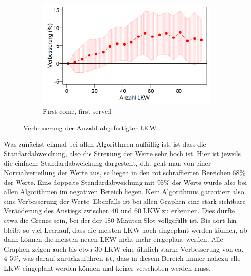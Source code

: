 \begin{figure}[H]
\begin{subfigure}{.5\textwidth}
  \centering
  \includegraphics[width=\linewidth]{images/graphs/rsNumberOfTrucksFcfs_AnzahlAbgefertigt.png}
  \caption{First come, first served}
  \label{fig:eal3}
\end{subfigure}

\caption{Verbesserung der Anzahl abgefertigter LKW}
\label{fig:evalAnzahlLkw}
\end{figure}

Was zunächst einmal bei allen Algorithmen auffällig ist, ist dass die Standardabweichung, also die Streuung der Werte sehr hoch ist. Hier ist jeweils die einfache Standardabweichung dargestellt, d.h. geht man von einer Normalverteilung der Werte aus, so liegen in den rot schraffierten Bereichen 68\% der Werte. Eine doppelte Standardabweichung mit 95\% der Werte würde also bei allen Algorithmen im negativen Bereich liegen. Kein Algorithmus garantiert also eine Verbesserung der Werte. Ebenfalls ist bei allen Graphen eine stark sichtbare Veränderung des Anstiegs zwischen 40 und 60 LKW zu erkennen. Dies dürfte etwa die Grenze sein, bei der der 180 Minuten Slot vollgefüllt ist. Bis dort hin bleibt so viel Leerlauf, dass die meisten LKW noch eingeplant werden können, ab dann können die meisten neuen LKW nicht mehr eingeplant werden. Alle Graphen zeigen auch bis etwa 30 LKW eine ähnlich starke Verbesserung von ca. 4-5\%, was darauf zurückzuführen ist, dass in diesem Bereich immer nahezu alle LKW eingeplant werden können und keiner verschoben werden muss.

